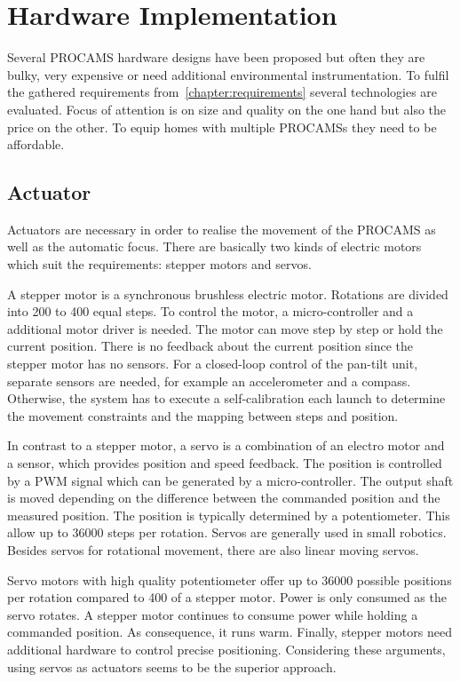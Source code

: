 \chapter{Hardware Implementation}

Several \acf{PROCAMS} hardware designs have been proposed but often they are bulky, very expensive or need additional environmental instrumentation.
To fulfil the gathered requirements from~\autoref{chapter:requirements} several technologies are evaluated. Focus of attention is on size and quality on the one hand but also the price on the other.
To equip homes with multiple PROCAMSs they need to be affordable.

\section{Actuator}\label{actuator}
Actuators are necessary in order to realise the movement of the \ac{PROCAMS} as well as the automatic focus. There are basically two kinds of electric motors which suit the requirements: stepper motors and servos. 

A stepper motor is a synchronous brushless electric motor.
Rotations are divided into 200 to 400 equal steps. To control the motor, a micro-controller and a additional motor driver is needed. The motor can move step by step or hold the current position. There is no feedback about the current position since the stepper motor has no sensors. For a closed-loop control of the pan-tilt unit, separate sensors are needed, for example an accelerometer and a compass.
Otherwise, the system has to execute a self-calibration each launch to determine the movement constraints and the mapping between steps and position. 

In contrast to a stepper motor, a servo is a combination of an electro motor and a sensor, which provides position and speed feedback.
The position is controlled by a \ac{PWM} signal which can be generated by a micro-controller. The output shaft is moved depending on the difference between the commanded position and the measured position. The position is typically determined by a potentiometer. This allow up to 36000 steps per rotation. Servos are generally used in small robotics. Besides servos for rotational movement, there are also linear moving servos. 

Servo motors with high quality potentiometer offer up to 36000 possible positions per rotation compared to 400 of a stepper motor. Power is only consumed as the servo rotates. A stepper motor continues to consume power while holding a commanded position. As consequence, it runs warm. Finally, stepper motors need additional hardware to control precise positioning. Considering these arguments, using servos as actuators seems to be the superior approach. 

